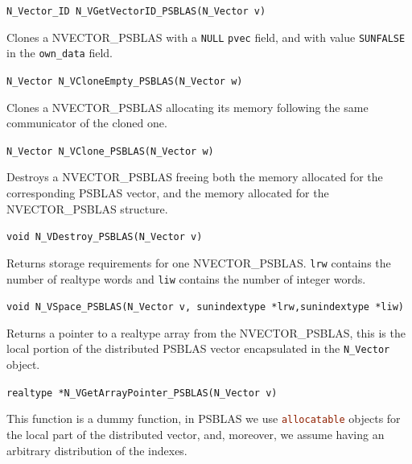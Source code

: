 \documentclass[twoside,a4paper]{refart}
\theoremstyle{definition}
\begin{document}
\begin{description}
	 \lstinline[style=CStyle]|N_Vector_ID N_VGetVectorID_PSBLAS(N_Vector v)|
 	
 	\item[\fbox{\texttt{N\_VCloneEmpty\_PSBLAS}}] Clones a NVECTOR\_PSBLAS with a \lstinline[style=CStyle]|NULL| \lstinline[style=CStyle]|pvec| field, and with value \lstinline[style=CStyle]|SUNFALSE| in the \lstinline[style=CStyle]|own_data| field.
 	
 	 \lstinline[style=CStyle]|N_Vector N_VCloneEmpty_PSBLAS(N_Vector w)|
 	
 	\item[\fbox{\texttt{N\_VClone\_PSBLAS}}] Clones a NVECTOR\_PSBLAS allocating its memory following the same communicator of the cloned one.
 	
 	 \lstinline[style=CStyle]|N_Vector N_VClone_PSBLAS(N_Vector w)|
 	
 	\item[\fbox{\texttt{N\_VDestroy\_PSBLAS}}] Destroys a NVECTOR\_PSBLAS freeing both the memory allocated for the corresponding PSBLAS vector, and the memory allocated for the NVECTOR\_PSBLAS structure.
 	
 	 \lstinline[style=CStyle]|void N_VDestroy_PSBLAS(N_Vector v)|
 	
 	\item[\fbox{\texttt{N\_VSpace\_PSBLAS}}] Returns storage requirements for one NVECTOR\_PSBLAS. \lstinline[style=CStyle]|lrw| contains the number of realtype words and \lstinline[style=CStyle]|liw| contains the number of integer words.
 	
 	 \lstinline[style=CStyle]|void N_VSpace_PSBLAS(N_Vector v, sunindextype *lrw,sunindextype *liw)|
 	
 	\item[\fbox{\texttt{N\_VGetArrayPointer\_PSBLAS}}] Returns a pointer to a realtype array from the NVECTOR\_PSBLAS, this is the local portion of the distributed PSBLAS vector encapsulated in the \texttt{N\_Vector} object.
 	
 	 \lstinline[style=CStyle]|realtype *N_VGetArrayPointer_PSBLAS(N_Vector v)|
 	
 	\item[\fbox{\texttt{N\_VSetArrayPointer\_PSBLAS}}] This function is a dummy function, in PSBLAS we use \lstinline[language=Fortran]|allocatable| objects for the local part of the distributed vector, and, moreover, we assume having an arbitrary distribution of the indexes.
 	

\end{description}
\end{document}
